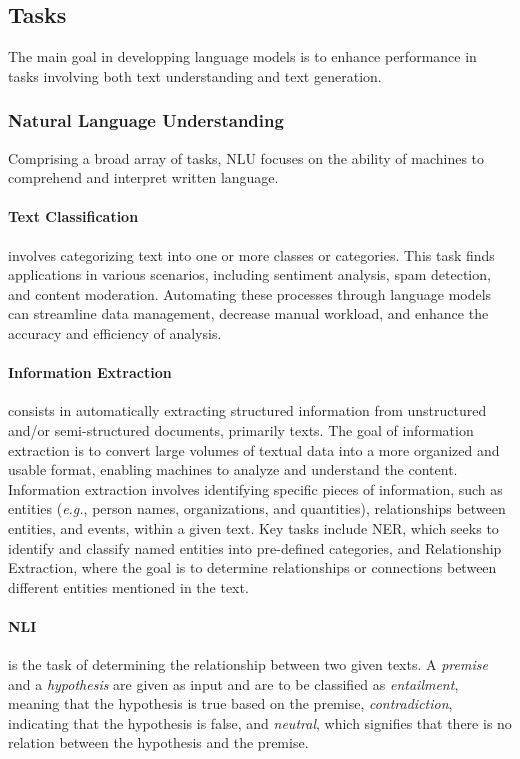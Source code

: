 \subsection{Tasks} 

The main goal in developping language models is to enhance performance in tasks involving both text understanding and text generation. 

\subsubsection{Natural Language Understanding}

Comprising a broad array of tasks, \ac{NLU} focuses on the ability of machines to comprehend and interpret written language. 

\paragraph{Text Classification} involves categorizing text into one or more classes or categories. This task finds applications in various scenarios, including sentiment analysis, spam detection, and content moderation. Automating these processes through language models can streamline data management, decrease manual workload, and enhance the accuracy and efficiency of analysis. 

\paragraph{Information Extraction} consists in automatically extracting structured information from unstructured and/or semi-structured documents, primarily texts. The goal of information extraction is to convert large volumes of textual data into a more organized and usable format, enabling machines to analyze and understand the content. Information extraction involves identifying specific pieces of information, such as entities (\textit{e.g.}, person names, organizations, and quantities), relationships between entities, and events, within a given text. Key tasks include \ac{NER}, which seeks to identify and classify named entities into pre-defined categories, and Relationship Extraction, where the goal is to determine relationships or connections between different entities mentioned in the text. 

\paragraph{\ac{NLI}} is the task of determining the relationship between two given texts. A \textit{premise} and a \textit{hypothesis} are given as input and are to be classified as \textit{entailment}, meaning that the hypothesis is true based on the premise, \textit{contradiction}, indicating that the hypothesis is false, and \textit{neutral}, which signifies that there is no relation between the hypothesis and the premise.

